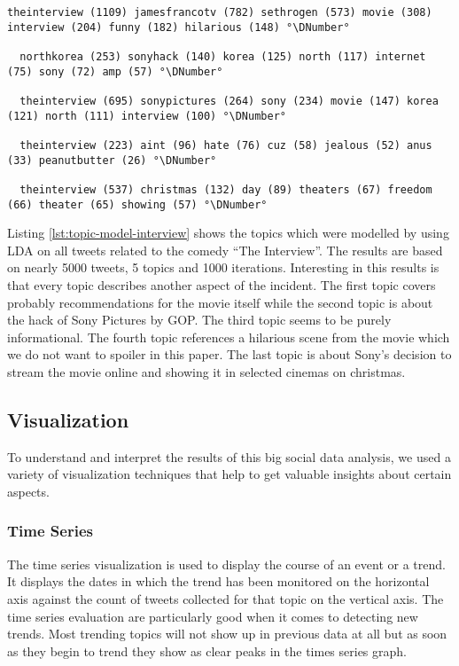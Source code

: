 \begin{lstlisting}[caption={[Topic Model for stolen movie \enquote{The Interview}] Topic Model for stolen movie \enquote{The Interview}}, label={lst:topic-model-interview}, float=h]
  theinterview (1109) jamesfrancotv (782) sethrogen (573) movie (308) interview (204) funny (182) hilarious (148) °\DNumber°

  northkorea (253) sonyhack (140) korea (125) north (117) internet (75) sony (72) amp (57) °\DNumber°

  theinterview (695) sonypictures (264) sony (234) movie (147) korea (121) north (111) interview (100) °\DNumber°

  theinterview (223) aint (96) hate (76) cuz (58) jealous (52) anus (33) peanutbutter (26) °\DNumber°

  theinterview (537) christmas (132) day (89) theaters (67) freedom (66) theater (65) showing (57) °\DNumber°
\end{lstlisting}

Listing \ref{lst:topic-model-interview} shows the topics which were modelled by using \ac{LDA} on all tweets related to the comedy \enquote{The Interview}. The results are based on nearly 5000 tweets, 5 topics and 1000 iterations. Interesting in this results is that every topic describes another aspect of the incident. The first topic covers probably recommendations for the movie itself while the second topic is about the hack of Sony Pictures by GOP. The third topic seems to be purely informational. The fourth topic references a hilarious scene from the movie which we do not want to spoiler in this paper. The last topic is about Sony's decision to stream the movie online and showing it in selected cinemas on christmas.

\subsection{Visualization}
\label{subsec:visualization}
To understand and interpret the results of this big social data analysis, we used a variety of visualization techniques that help to get valuable insights about certain aspects.

\subsubsection{Time Series}
\label{subsubsec:vis-time-series}
The time series visualization is used to display the course of an event or a trend. It displays the dates in which the trend has been monitored on the horizontal axis against the count of tweets collected for that topic on the vertical axis. The time series evaluation are particularly good when it comes to detecting new trends. Most trending topics will not show up in previous data at all but as soon as they begin to trend they show as clear peaks in the times series graph.

